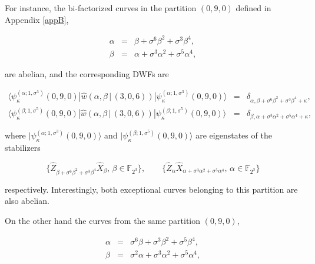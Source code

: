 \documentclass[quantumrep,article,submit,pdftex,moreauthors]{Definitions/mdpi}
\begin{document}
For instance, the bi-factorized curves in the partition $(0,9,0)$ defined in
Appendix \ref{appB},

\begin{eqnarray}
  \alpha
  &=& \beta + \sigma^{6} \beta^{2} + \sigma^{3}\beta^{4},
  \label{ac1} \\
  \beta
  &=& \alpha + \sigma^{3} \alpha^{2} + \sigma^{5}\alpha^{4},
  \label{ac2}
\end{eqnarray}

are abelian, and the corresponding DWFs are

\begin{eqnarray}
  \langle \psi_{\kappa}^{(\alpha ; 1,\sigma^{3})}(0,9,0)
  |\hat{w}\left(\alpha,\beta \, | \, (3,0,6)\right)
  |\psi_{\kappa}^{(\alpha ; 1,\sigma^{3})}(0,9,0)\rangle
  &=& \delta_{\alpha, \beta + \sigma^{6}\beta^{2} + \sigma^{3} \beta^{4} + \kappa}, \\
  \langle \psi_{\kappa }^{(\beta ; 1,\sigma^{5})}(0,9,0)
  |\hat{w}\left(\alpha,\beta \, | \, (3,0,6)\right)
  |\psi_{\kappa}^{(\beta ; 1,\sigma^{5})}(0,9,0)\rangle
  &=& \delta_{\beta,\alpha + \sigma^{3}\alpha^{2} + \sigma^{5} \alpha^{4} + \kappa},
  \label{ac2 delta}
\end{eqnarray}

where $|\psi_{\kappa}^{(\alpha ; 1,\sigma^{3})}(0,9,0)\rangle$ and
$|\psi_{\kappa }^{(\beta ; 1,\sigma^{5})}(0,9,0)\rangle$ are eigenstates of the
stabilizers

\begin{equation*}
  \{\hat{Z}_{\beta + \sigma^{6}\beta ^{2}+\sigma^{3}\beta^{4}} \hat{X}_{\beta},
  \, \beta \in \mathbb{F}_{2^{3}}\},
  \qquad \{\hat{Z}_{\alpha } \hat{X}_{\alpha + \sigma^{3}\alpha^{2} + \sigma^{5}\alpha^{4}},
  \, \alpha \in \mathbb{F}_{2^{3}}\}
\end{equation*}

respectively. Interestingly, both exceptional curves belonging to this partition
are also abelian.

On the other hand the curves from the same partition $(0,9,0)$,

\begin{eqnarray}
  \alpha
  &=& \sigma^{6}\beta +\sigma ^{3}\beta ^{2}+\sigma ^{5}\beta ^{4},
  \label{nac1} \\
  \beta
  &=& \sigma^{2}\alpha +\sigma ^{3}\alpha ^{2}+\sigma ^{5}\alpha ^{4},
  \label{nac}
\end{eqnarray}
\end{document}
